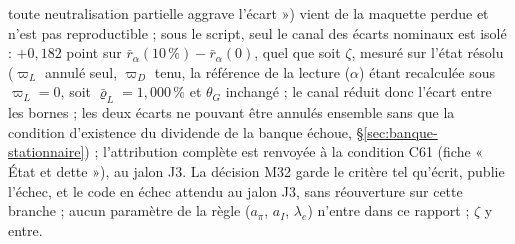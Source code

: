 \documentclass[11pt,a4paper]{article}
\begin{document}
\begin{proposee}
toute neutralisation partielle aggrave l'écart ») vient de la maquette perdue et n'est pas reproductible ; sous le script, seul le canal des écarts nominaux est isolé : $+0{,}182$ point sur $\bar r_\alpha(10\,\%) - \bar r_\alpha(0)$, quel que soit $\zeta$, mesuré sur l'état résolu ($\varpi_L$ annulé seul, $\varpi_D$ tenu, la référence de la lecture ($\alpha$) étant recalculée sous $\varpi_L = 0$, soit $\bar\varrho_L = 1{,}000\,\%$ et $\theta_G$ inchangé ; le canal réduit donc l'écart entre les bornes ; les deux écarts ne pouvant être annulés ensemble sans que la condition d'existence du dividende de la banque échoue, \S\ref{sec:banque-stationnaire}) ; l'attribution complète est renvoyée à la condition C61 (fiche « État et dette »), au jalon J3. La décision M32 garde le critère tel qu'écrit, publie l'échec, et le code en échec attendu au jalon J3, sans réouverture sur cette branche ; aucun paramètre de la règle ($a_\pi$, $a_I$, $\lambda_e$) n'entre dans ce rapport ; $\zeta$ y entre.


\end{proposee}
\end{document}
